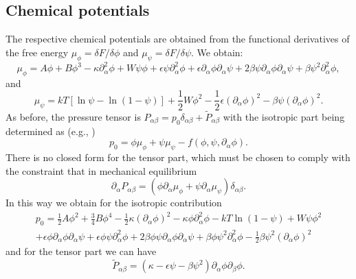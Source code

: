 \subsection{Chemical potentials}

The respective chemical potentials are obtained from the functional
derivatives of the free energy $\mu_\phi = \delta F / \delta \phi$ and
$\mu_\psi = \delta F / \delta \psi$. We obtain:
\begin{equation}
\mu_\phi =
A\phi + B\phi^3 -\kappa \partial_\alpha^2 \phi
+ W\psi\phi + \epsilon\psi\partial_\alpha^2 \phi
+ \epsilon \partial_\alpha \phi \partial_\alpha \psi
+ 2\beta \psi\partial_\alpha\phi \partial_\alpha \psi
+ \beta \psi^2 \partial_\alpha^2 \phi,
\end{equation}
and
\begin{equation}
\mu_\psi = kT \left[ \ln\psi - \ln(1-\psi) \right]
+ {\textstyle \frac{1}{2}}W\phi^2
- {\textstyle \frac{1}{2}}\epsilon (\partial_\alpha \phi)^2
- \beta\psi (\partial_\alpha \phi)^2.
\end{equation}
As before, the pressure tensor is $P_{\alpha\beta} = p_0\delta_{\alpha\beta}
+ \tilde{P}_{\alpha\beta}$ with the isotropic part being determined as (e.g.,
\cite{theissengompper})
\begin{equation}
p_0 = \phi \mu_\phi + \psi \mu_\psi - f(\phi, \psi, \partial_\alpha \phi).
\end{equation}
There is no closed form for the tensor part, which must be chosen to
comply with the constraint that in mechanical equilibrium
\begin{equation}
\partial_\alpha P_{\alpha\beta} = (\phi\partial_\alpha\mu_\phi +
\psi\partial_\alpha\mu_\psi)\delta_{\alpha\beta}.
\end{equation}
In this way we obtain for the isotropic contribution
\begin{eqnarray}
p_0 = {\textstyle \frac{1}{2}}A\phi^2 + {\textstyle \frac{3}{4}}B\phi^4 
- {\textstyle\frac{1}{2}}\kappa (\partial_\alpha\phi)^2 
- \kappa \phi \partial_\alpha^2 \phi
- kT \ln(1-\psi) + W\psi\phi^2
\nonumber\\
+ \epsilon \phi \partial_\alpha \phi \partial_\alpha \psi
+ \epsilon\phi\psi \partial_\alpha^2 \phi
+ 2 \beta\phi\psi \partial_\alpha \phi \partial_\alpha\psi
+ \beta \phi \psi^2 \partial_\alpha^2 \phi
- {\textstyle\frac{1}{2}} \beta \psi^2 (\partial_\alpha \phi)^2
\end{eqnarray}
and for the tensor part we can have
\begin{equation}
\tilde{P}_{\alpha\beta} =
(\kappa - \epsilon \psi - \beta\psi^2) 
\partial_\alpha \phi \partial_\beta \phi.
\end{equation}

